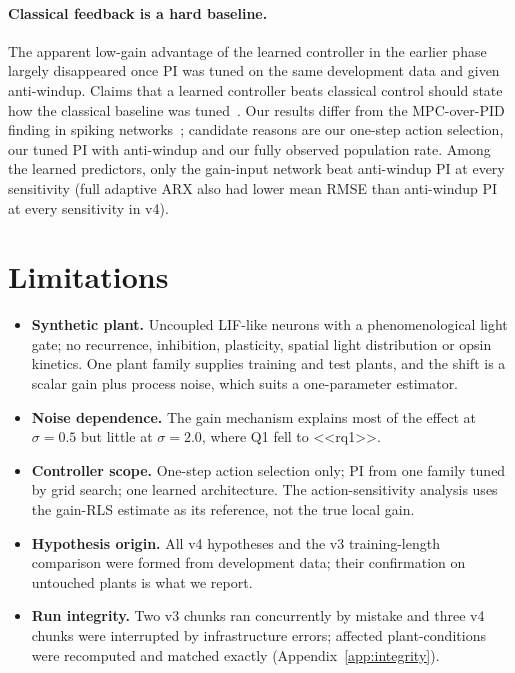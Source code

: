 \documentclass[11pt]{article}
\begin{document}
\paragraph{Classical feedback is a hard baseline.} The apparent low-gain advantage of the learned controller in the earlier phase largely disappeared once PI was tuned on the same development data and given anti-windup. Claims that a learned controller beats classical control should state how the classical baseline was tuned~\cite{kunapuli2025}. Our results differ from the MPC-over-PID finding in spiking networks~\cite{fehrman2024}; candidate reasons are our one-step action selection, our tuned PI with anti-windup and our fully observed population rate. Among the learned predictors, only the gain-input network beat anti-windup PI at every sensitivity (full adaptive ARX also had lower mean RMSE than anti-windup PI at every sensitivity in v4).

\section{Limitations}
\begin{itemize}\setlength\itemsep{2pt}
\item \textbf{Synthetic plant.} Uncoupled LIF-like neurons with a phenomenological light gate; no recurrence, inhibition, plasticity, spatial light distribution or opsin kinetics. One plant family supplies training and test plants, and the shift is a scalar gain plus process noise, which suits a one-parameter estimator.
\item \textbf{Noise dependence.} The gain mechanism explains most of the effect at $\sigma=0.5$ but little at $\sigma=2.0$, where Q1 fell to <<rq1>>.
\item \textbf{Controller scope.} One-step action selection only; PI from one family tuned by grid search; one learned architecture. The action-sensitivity analysis uses the gain-RLS estimate as its reference, not the true local gain.
\item \textbf{Hypothesis origin.} All v4 hypotheses and the v3 training-length comparison were formed from development data; their confirmation on untouched plants is what we report.
\item \textbf{Run integrity.} Two v3 chunks ran concurrently by mistake and three v4 chunks were interrupted by infrastructure errors; affected plant-conditions were recomputed and matched exactly (Appendix~\ref{app:integrity}).
\end{itemize}
\end{document}
